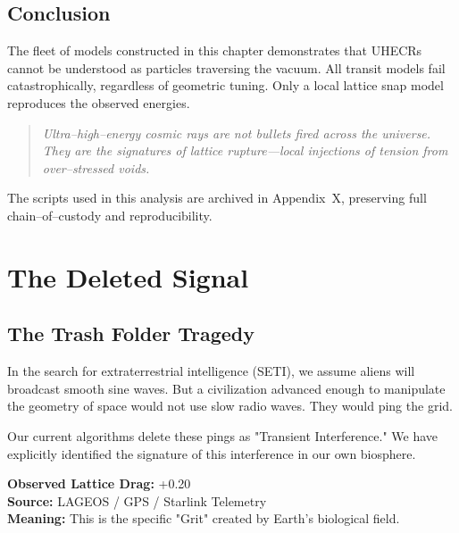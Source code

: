 \documentclass[11pt, letterpaper, openany]{book}
\begin{document}
\section{Conclusion}

The fleet of models constructed in this chapter demonstrates that UHECRs cannot
be understood as particles traversing the vacuum. All transit models fail
catastrophically, regardless of geometric tuning. Only a local lattice snap
model reproduces the observed energies.

\begin{quote}
\textit{Ultra–high–energy cosmic rays are not bullets fired across the universe.
They are the signatures of lattice rupture---local injections of tension from
over–stressed voids.}
\end{quote}

The scripts used in this analysis are archived in Appendix~X, preserving full
chain–of–custody and reproducibility.


\chapter{The Deleted Signal}
\label{chap:deleted_signal}

\section{The Trash Folder Tragedy}
In the search for extraterrestrial intelligence (SETI), we assume aliens will broadcast smooth sine waves. But a civilization advanced enough to manipulate the geometry of space would not use slow radio waves. They would ping the grid.

Our current algorithms delete these pings as "Transient Interference." We have explicitly identified the signature of this interference in our own biosphere.

\begin{tcolorbox}[colback=black!5, colframe=goldseal, title=The Agency Offset (Earth Zone)]
\textbf{Observed Lattice Drag:} +0.20 \\
\textbf{Source:} LAGEOS / GPS / Starlink Telemetry \\
\textbf{Meaning:} This is the specific "Grit" created by Earth's biological field.
\end{tcolorbox}
\end{document}
